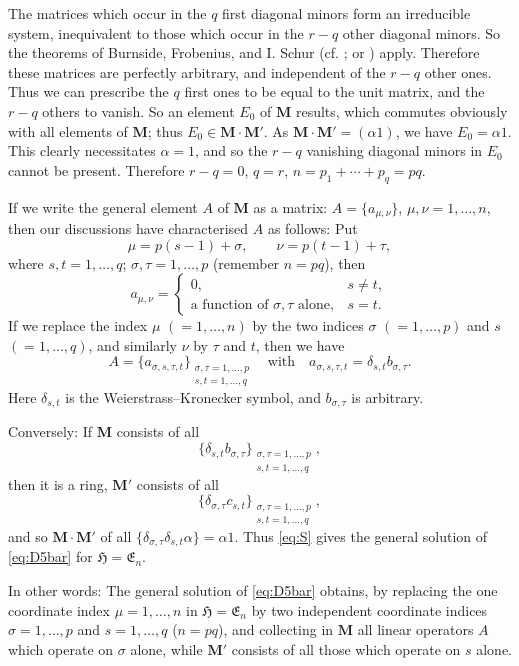 \documentclass[12pt,b5paper,twoside]{article}
\newcommand{\Hspace}{\mathfrak H}
\newcommand{\M}{\mathbf M}
\begin{document}
The matrices which occur in the $q$ first diagonal minors form an irreducible
system, inequivalent to those which occur in the $r-q$ other diagonal minors.
So the theorems of Burnside, Frobenius, and I. Schur
(cf. \cite{ref3,ref8}; or \cite[p.~412]{ref14}) apply. Therefore these matrices
are perfectly arbitrary, and independent of the $r-q$ other ones. Thus we can
prescribe the $q$ first ones to be equal to the unit matrix, and the $r-q$ others
to vanish. So an element $E_0$ of $\M$ results, which commutes obviously with
all elements of $\M$; thus $E_0\in\M\cdot\M'$. As
$\M\cdot\M'=(\alpha1)$, we have $E_0=\alpha1$. This clearly necessitates
$\alpha=1$, and so the $r-q$ vanishing diagonal minors in $E_0$ cannot be
present. Therefore $r-q=0$, $q=r$, $n=p_1+\cdots+p_q=pq$.

If we write the general element $A$ of $\M$ as a matrix:
$A=\{a_{\mu,\nu}\}$, $\mu,\nu=1,\ldots,n$, then our discussions have
characterised $A$ as follows: Put
\[
 \mu=p(s-1)+\sigma,\qquad \nu=p(t-1)+\tau,
\]
where $s,t=1,\ldots,q$; $\sigma,\tau=1,\ldots,p$ (remember $n=pq$), then
\[
 a_{\mu,\nu}=
 \begin{cases}
  0,&s\ne t,\\
  \text{a function of $\sigma,\tau$ alone},&s=t.
 \end{cases}
\]
If we replace the index $\mu$ $(=1,\ldots,n)$ by the two indices $\sigma$
$(=1,\ldots,p)$ and $s$ $(=1,\ldots,q)$, and similarly $\nu$ by $\tau$ and
$t$, then we have
\[
 A=\{a_{\sigma,s,\tau,t}\}_{\substack{\sigma,\tau=1,\ldots,p\\
                                      s,t=1,\ldots,q}}
 \quad\text{with}\quad
 a_{\sigma,s,\tau,t}=\delta_{s,t}b_{\sigma,\tau}.
 \tag{S}\label{eq:S}
\]
Here $\delta_{s,t}$ is the Weierstrass--Kronecker symbol, and
$b_{\sigma,\tau}$ is arbitrary.

Conversely: If $\M$ consists of all
\[
 \{\delta_{s,t}b_{\sigma,\tau}\}_{\substack{\sigma,\tau=1,\ldots,p\\
                                             s,t=1,\ldots,q}},
\]
then it is a ring, $\M'$ consists of all
\[
 \{\delta_{\sigma,\tau}c_{s,t}\}_{\substack{\sigma,\tau=1,\ldots,p\\
                                             s,t=1,\ldots,q}},
\]
and so $\M\cdot\M'$ of all
$\{\delta_{\sigma,\tau}\delta_{s,t}\alpha\}=\alpha1$. Thus \eqref{eq:S}
gives the general solution of \eqref{eq:D5bar} for $\Hspace=\mathfrak E_n$.

In other words: The general solution of \eqref{eq:D5bar} obtains, by replacing
the one coordinate index $\mu=1,\ldots,n$ in $\Hspace=\mathfrak E_n$ by two
independent coordinate indices $\sigma=1,\ldots,p$ and $s=1,\ldots,q$
($n=pq$), and collecting in $\M$ all linear operators $A$ which operate on
$\sigma$ alone, while $\M'$ consists of all those which operate on $s$ alone.
\end{document}
